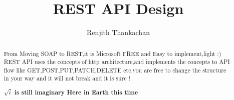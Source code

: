 \documentclass[]{article}
\begin{document}
\title{REST API Design}
\author{Renjith Thankachan}
\maketitle

\begin{abstract}
From Moving SOAP to REST,it is Microsoft FREE and Easy to implement,light :)
REST API uses the concepts of http architecture,and implements the concepts to API flow like GET,POST,PUT,PATCH,DELETE etc.you are free to change the structure in your way and it will not break and it is sure !

\textbf{$\sqrt{i}$ is still imaginary Here in Earth this time}
\end{abstract}
\end{document}
